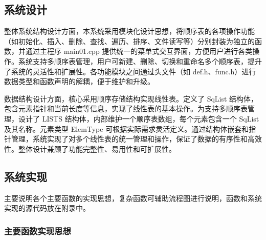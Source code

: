 \documentclass[supercite]{Experimental_Report}
\theoremstyle{definition}
\begin{document}
\subsection{系统设计}

整体系统结构设计方面，本系统采用模块化设计思想，将顺序表的各项操作功能（如初始化、插入、删除、查找、遍历、排序、文件读写等）分别封装为独立的函数，并通过主程序 main01.cpp 提供统一的菜单式交互界面，方便用户进行各类操作。系统支持多顺序表管理，用户可新建、删除、切换和重命名多个顺序表，提升了系统的灵活性和扩展性。各功能模块之间通过头文件（如 def.h、func.h）进行数据类型和函数声明的解耦，便于维护和升级。

数据结构设计方面，核心采用顺序存储结构实现线性表。定义了 SqList 结构体，包含元素指针和当前长度等信息，实现了线性表的基本操作。为支持多顺序表管理，设计了 LISTS 结构体，内部维护一个顺序表数组，每个元素包含一个 SqList 及其名称。元素类型 ElemType 可根据实际需求灵活定义。通过结构体嵌套和指针管理，系统实现了对多个线性表的统一管理和操作，保证了数据的有序性和高效性。整体设计兼顾了功能完整性、易用性和可扩展性。

\subsection{系统实现}

主要说明各个主要函数的实现思想，复杂函数可辅助流程图进行说明，函数和系统实现的源代码放在附录中。

\subsubsection{主要函数实现思想}
\end{document}
